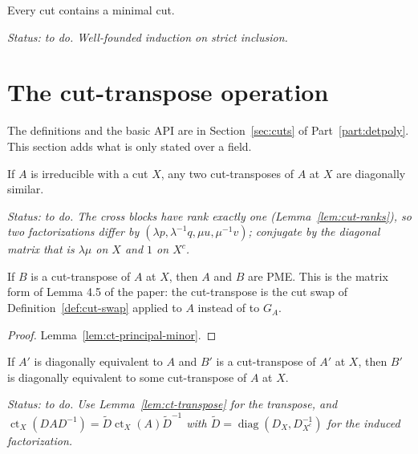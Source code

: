 \begin{lemma}
\label{lem:minimal-cut-exists}
\leanok
{}
Every cut contains a minimal cut.
\end{lemma}
\noindent\emph{Status: to do. Well-founded induction on strict inclusion.}

\section{The cut-transpose operation}

The definitions and the basic API are in Section~\ref{sec:cuts} of Part~\ref{part:detpoly}.
This section adds what is only stated over a field.

\begin{lemma}
\label{lem:ct-unique}
\leanok
{}
If $A$ is irreducible with a cut $X$, any two cut-transposes of $A$ at $X$ are diagonally
similar.
\end{lemma}
\noindent\emph{Status: to do. The cross blocks have rank exactly one
(Lemma~\ref{lem:cut-ranks}), so two factorizations differ by
$(\lambda p,\lambda^{-1}q,\mu u,\mu^{-1}v)$; conjugate by the diagonal matrix that is
$\lambda\mu$ on $X$ and $1$ on $X^c$.}

\begin{lemma}
\label{lem:ct-pme}
\leanok
{}
If $B$ is a cut-transpose of $A$ at $X$, then $A$ and $B$ are PME. This is the matrix form of
Lemma 4.5 of the paper: the cut-transpose is the cut swap of Definition~\ref{def:cut-swap}
applied to $A$ instead of to $G_A$.
\end{lemma}
\begin{proof}
\leanok
Lemma~\ref{lem:ct-principal-minor}.
\end{proof}

\begin{lemma}
\label{lem:ct-de-compat}
\leanok
{}
If $A'$ is diagonally equivalent to $A$ and $B'$ is a cut-transpose of $A'$ at $X$, then
$B'$ is diagonally equivalent to some cut-transpose of $A$ at $X$.
\end{lemma}
\noindent\emph{Status: to do. Use Lemma~\ref{lem:ct-transpose} for the transpose, and
$\operatorname{ct}_X(DAD^{-1})=\tilde D\operatorname{ct}_X(A)\tilde D^{-1}$ with
$\tilde D=\operatorname{diag}(D_X,D_{X^c}^{-1})$ for the induced factorization.}

